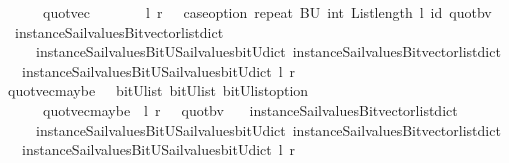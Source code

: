\begin{isabellebody}
\ \ \ \ \ {\isachardoublequoteopen}\ quot{\isacharunderscore}vec\ \ \ \ \ \ \ \ l\ r\ {\isacharequal}\ {\isacharparenleft}\ case{\isacharunderscore}option\ {\isacharparenleft}repeat\ {\isacharbrackleft}BU{\isacharbrackright}\ {\isacharparenleft}int\ {\isacharparenleft}List{\isachardot}length\ l{\isacharparenright}{\isacharparenright}{\isacharparenright}\ id\ {\isacharparenleft}quot{\isacharunderscore}bv\ \isanewline
\ \ {\isacharparenleft}instance{\isacharunderscore}Sail{}{\isacharunderscore}values{\isacharunderscore}Bitvector{\isacharunderscore}list{\isacharunderscore}dict\isanewline
\ \ \ \ \ instance{\isacharunderscore}Sail{}{\isacharunderscore}values{\isacharunderscore}BitU{\isacharunderscore}Sail{}{\isacharunderscore}values{\isacharunderscore}bitU{\isacharunderscore}dict{\isacharparenright}\ {\isacharparenleft}instance{\isacharunderscore}Sail{}{\isacharunderscore}values{\isacharunderscore}Bitvector{\isacharunderscore}list{\isacharunderscore}dict\isanewline
\ \ \ instance{\isacharunderscore}Sail{}{\isacharunderscore}values{\isacharunderscore}BitU{\isacharunderscore}Sail{}{\isacharunderscore}values{\isacharunderscore}bitU{\isacharunderscore}dict{\isacharparenright}\ l\ r{\isacharparenright}{\isacharparenright}{\isachardoublequoteclose}\isanewline
\isanewline
{}\isamarkupfalse%
\ quot{\isacharunderscore}vec{\isacharunderscore}maybe\ \ {\isacharcolon}{\isacharcolon}\ {\isachardoublequoteopen}{\isacharparenleft}bitU{\isacharparenright}list\ {\isasymRightarrow}{\isacharparenleft}bitU{\isacharparenright}list\ {\isasymRightarrow}{\isacharparenleft}{\isacharparenleft}bitU{\isacharparenright}list{\isacharparenright}option\ {\isachardoublequoteclose}\ \ \ \isanewline
\ \ \ \ \ {\isachardoublequoteopen}\ quot{\isacharunderscore}vec{\isacharunderscore}maybe\ \ l\ r\ {\isacharequal}\ {\isacharparenleft}\ quot{\isacharunderscore}bv\ \isanewline
\ \ {\isacharparenleft}instance{\isacharunderscore}Sail{}{\isacharunderscore}values{\isacharunderscore}Bitvector{\isacharunderscore}list{\isacharunderscore}dict\isanewline
\ \ \ \ \ instance{\isacharunderscore}Sail{}{\isacharunderscore}values{\isacharunderscore}BitU{\isacharunderscore}Sail{}{\isacharunderscore}values{\isacharunderscore}bitU{\isacharunderscore}dict{\isacharparenright}\ {\isacharparenleft}instance{\isacharunderscore}Sail{}{\isacharunderscore}values{\isacharunderscore}Bitvector{\isacharunderscore}list{\isacharunderscore}dict\isanewline
\ \ \ instance{\isacharunderscore}Sail{}{\isacharunderscore}values{\isacharunderscore}BitU{\isacharunderscore}Sail{}{\isacharunderscore}values{\isacharunderscore}bitU{\isacharunderscore}dict{\isacharparenright}\ l\ r\ {\isacharparenright}{\isachardoublequoteclose}\isanewline

\end{isabellebody}
